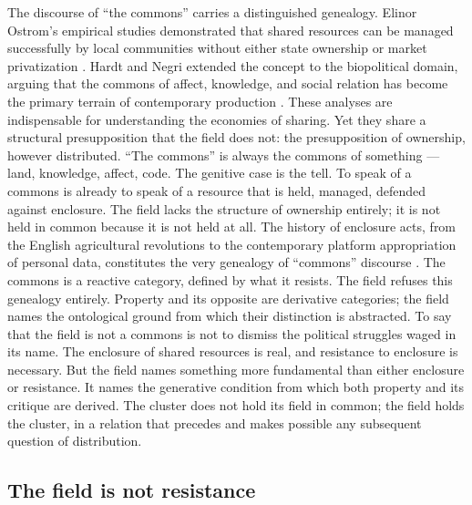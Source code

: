The discourse of ``the commons'' carries a distinguished genealogy. Elinor Ostrom's empirical studies demonstrated that shared resources can be managed successfully by local communities without either state ownership or market privatization \cite{ostrom_1990}. Hardt and Negri extended the concept to the biopolitical domain, arguing that the commons of affect, knowledge, and social relation has become the primary terrain of contemporary production \cite{hardt_negri_2009}. These analyses are indispensable for understanding the economies of sharing. Yet they share a structural presupposition that the field does not: the presupposition of ownership, however distributed. “The commons” is always the commons of something — land, knowledge, affect, code. The genitive case is the tell. To speak of a commons is already to speak of a resource that is held, managed, defended against enclosure. The field lacks the structure of ownership entirely; it is not held in common because it is not held at all. The history of enclosure acts, from the English agricultural revolutions to the contemporary platform appropriation of personal data, constitutes the very genealogy of “commons” discourse \cite{harvey_2003}. The commons is a reactive category, defined by what it resists. The field refuses this genealogy entirely. Property and its opposite are derivative categories; the field names the ontological ground from which their distinction is abstracted. To say that the field is not a commons is not to dismiss the political struggles waged in its name. The enclosure of shared resources is real, and resistance to enclosure is necessary. But the field names something more fundamental than either enclosure or resistance. It names the generative condition from which both property and its critique are derived. The cluster does not hold its field in common; the field holds the cluster, in a relation that precedes and makes possible any subsequent question of distribution.

\subsection{The field is not resistance}

